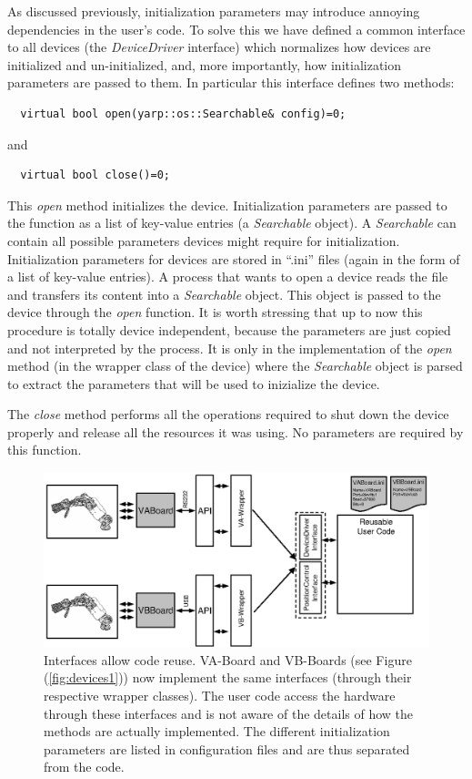 As discussed previously, initialization parameters may introduce annoying 
dependencies in the user's code. To solve this we have defined a common 
interface to all devices (the 
\emph{DeviceDriver} interface) which normalizes how devices are initialized
and un-initialized, and, more importantly, how initialization parameters 
are passed to them. In particular this interface defines two methods:
\begin{verbatim}
  virtual bool open(yarp::os::Searchable& config)=0;
\end{verbatim}
and
\begin{verbatim}
  virtual bool close()=0;
\end{verbatim}
This \emph{open} method initializes the device. Initialization parameters 
are passed to the function as a list of key-value entries 
(a \emph{Searchable} object). A \emph{Searchable} can contain all 
possible parameters devices might require for initialization. Initialization 
parameters for devices 
are stored in ``.ini'' files (again in the form of a list of key-value 
entries). A process that wants to open a device reads 
the file and transfers its content into a \emph{Searchable} object. This 
object is passed to the device through the \emph{open} function. 
It is worth stressing that up to now this procedure is totally device 
independent, because the parameters are just copied and not interpreted 
by the process. It is only in the implementation of the \emph{open} method 
(in the wrapper class of the device) where the \emph{Searchable} object 
is parsed to extract the parameters that will be used to inizialize the 
device.

The \emph{close} method performs all the operations required to shut down 
the device properly and release all the resources it was using. No
parameters are required by this function.

\begin{figure}[tbp]
\centerline{
\includegraphics[width=24cm]{fig-devices2}
}
\caption{Interfaces allow code reuse. VA-Board and VB-Boards (see 
Figure (\ref{fig:devices1})) now implement
the same interfaces (through their respective wrapper classes). The user 
code access the hardware through these interfaces and is not aware of 
the details of how the methods are actually implemented. The different 
initialization parameters are listed in configuration files and are thus 
separated from the code.}\label{fig:devices2}
\end{figure}

